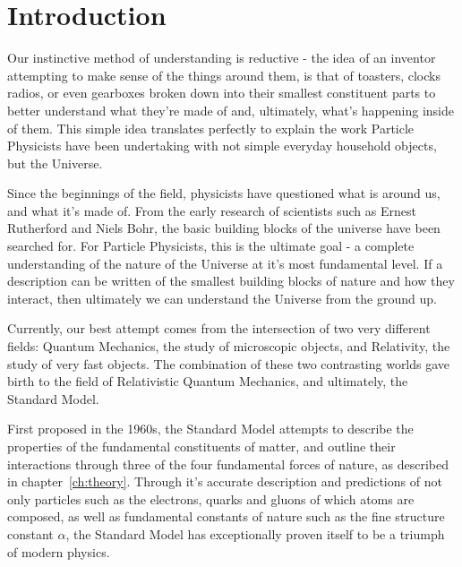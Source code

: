 
\chapter{Introduction}  %

\ifpdf
    \graphicspath{{Chapter1/Figs/Raster/}{Chapter1/Figs/PDF/}{Chapter1/Figs/}}
\else
    \graphicspath{{Chapter1/Figs/Vector/}{Chapter1/Figs/}}
\fi


\label{sec:introduction_intro}

Our instinctive method of understanding is reductive - the idea of an
inventor attempting to make sense of the things around them, is
that of toasters, clocks radios, or even gearboxes broken down into
their smallest constituent parts to better understand what they're made of and,
ultimately, what's happening inside of them. This simple idea translates
perfectly to explain the work Particle Physicists have been undertaking with
not simple everyday household objects, but the Universe.

Since the beginnings of the field, physicists have questioned
what is
around us, and what it's made of. From the early research of scientists such as
Ernest Rutherford and Niels Bohr, the basic building
blocks of the universe have been searched for. For Particle Physicists, this is
the ultimate goal - a complete understanding of the nature of the Universe
at it's most
fundamental level. If a description can be written of the smallest
building blocks of
nature and how they interact, then ultimately we can understand
the Universe from the ground up.

Currently, our best attempt comes from the intersection of two very different
fields: Quantum Mechanics, the study of microscopic objects, and Relativity, the
study of very fast objects. The combination of these
two contrasting worlds gave birth to the field of Relativistic
Quantum Mechanics, and ultimately, the Standard Model.

First proposed in the 1960s, the Standard Model attempts to describe the
properties of the fundamental constituents of matter, and outline their
interactions through three of the four fundamental forces of nature, as
described in chapter~\ref{ch:theory}. Through
it's accurate description and predictions of not only particles such as
the electrons, quarks and gluons of which atoms are composed,
as well as fundamental constants of nature such as the fine structure constant
$\alpha$, the
Standard Model has exceptionally proven itself to be a triumph of
modern physics.

